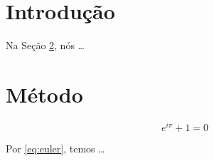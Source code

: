 \documentclass{article}
\begin{document}
\section{Introdução}
\label{sec:intro}

Na Seção  \ref{sec:method}, nós \ldots

\section{Método}
\label{sec:method}

\begin{equation}
\label{eq:euler}
e^{i\pi} + 1 = 0
\end{equation}

Por \eqref{eq:euler}, temos \ldots
\end{document}
